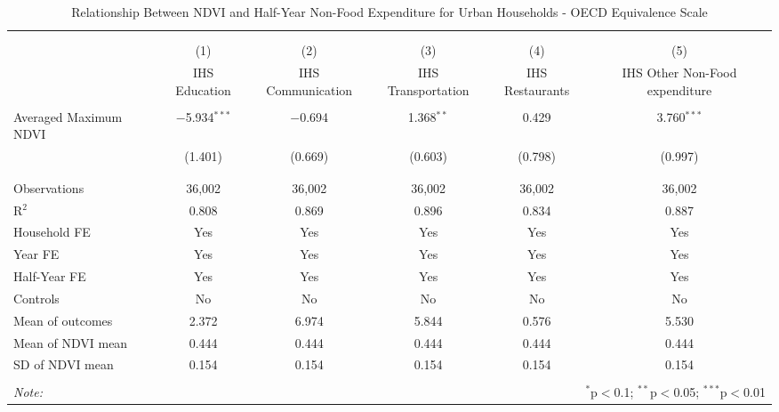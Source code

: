 
\begin{table}[!htbp] \centering 
  \caption{Relationship Between NDVI and Half-Year Non-Food Expenditure for Urban Households - OECD Equivalence Scale} 
  \label{ndvi_table_7_2_urban.tex} 
\normalsize 
\begin{tabular}{@{\extracolsep{5pt}}lccccc} 
\\[-1.8ex]\hline 
\hline \\[-1.8ex] 
\\[-1.8ex] & (1) & (2) & (3) & (4) & (5)\\ 
 & IHS Education & IHS Communication & IHS Transportation & IHS Restaurants & IHS Other Non-Food expenditure \\ 
\hline \\[-1.8ex] 
 Averaged Maximum NDVI & $-$5.934$^{***}$ & $-$0.694 & 1.368$^{**}$ & 0.429 & 3.760$^{***}$ \\ 
  & (1.401) & (0.669) & (0.603) & (0.798) & (0.997) \\ 
  & & & & & \\ 
\hline \\[-1.8ex] 
Observations & 36,002 & 36,002 & 36,002 & 36,002 & 36,002 \\ 
R$^{2}$ & 0.808 & 0.869 & 0.896 & 0.834 & 0.887 \\ 
Household FE & Yes & Yes & Yes & Yes & Yes \\ 
Year FE & Yes & Yes & Yes & Yes & Yes \\ 
Half-Year FE & Yes & Yes & Yes & Yes & Yes \\ 
Controls & No & No & No & No & No \\ 
Mean of outcomes & 2.372 & 6.974 & 5.844 & 0.576 & 5.530 \\ 
Mean of NDVI mean & 0.444 & 0.444 & 0.444 & 0.444 & 0.444 \\ 
SD of NDVI mean & 0.154 & 0.154 & 0.154 & 0.154 & 0.154 \\ 
\hline \\[-1.8ex] 
\textit{Note:}  & \multicolumn{5}{r}{$^{*}$p$<$0.1; $^{**}$p$<$0.05; $^{***}$p$<$0.01} \\ 
\end{tabular} 
\end{table} 
